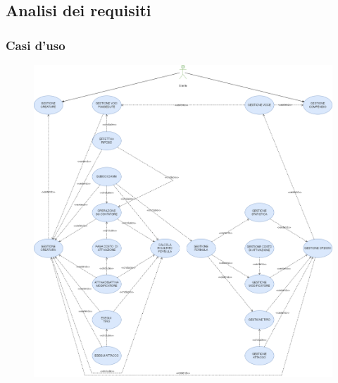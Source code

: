 \documentclass[a4paper, 11pt]{article}
\begin{document}
\newpage
\subsection{Analisi dei requisiti}
\subsubsection{Casi d'uso}
\begin{figure}[h!]
    \centering
    \includegraphics[width=1\textwidth,keepaspectratio]{Diagramma CU}
    \label{fig:useCase}
\end{figure}



\newpage
\end{document}
